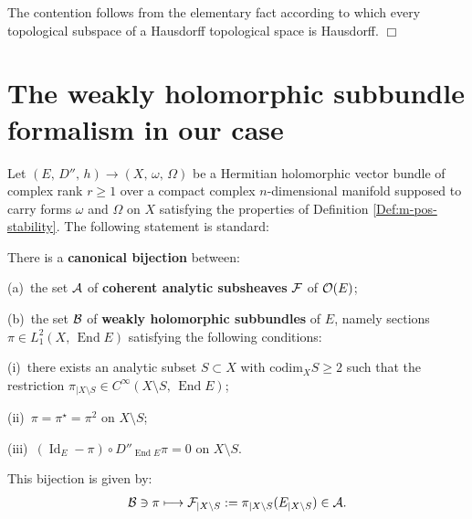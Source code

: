 \documentclass[12pt]{article}
\begin{document}
The contention follows from the elementary fact according to which every topological subspace of a Hausdorff topological space is Hausdorff.  \hfill $\Box$



\section{The weakly holomorphic subbundle formalism in our case}\label{section:w-h-subbundle_formalism}

Let $(E,\,D'',\,h)\longrightarrow(X,\,\omega,\,\Omega)$ be a Hermitian holomorphic vector bundle of complex rank $r\geq 1$ over a compact complex $n$-dimensional manifold supposed to carry forms $\omega$ and $\Omega$ on $X$ satisfying the properties of Definition \ref{Def:m-pos-stability}. The following statement is standard:

\begin{Fact}\label{Fact:sheaf_pi} There is a {\bf canonical bijection} between:

\vspace{1ex}

\noindent (a)\, the set ${\cal A}$ of {\bf coherent analytic subsheaves} ${\cal F}$ of ${\cal O}(E)$;

\vspace{1ex}

\noindent (b)\, the set ${\cal B}$ of {\bf weakly holomorphic subbundles} of $E$, namely sections $\pi\in L^2_1(X,\,\operatorname{End}E)$ satisfying the following conditions:

\vspace{1ex}

(i)\, there exists an analytic subset $S\subset X$ with $\mbox{codim}_XS\geq 2$ such that the restriction $\pi_{|X\setminus S}\in C^\infty(X\setminus S,\,\operatorname{End}E)$;

\vspace{1ex}

(ii)\, $\pi = \pi^\star = \pi^2$ on $X\setminus S$;

\vspace{1ex}

(iii)\, $(\operatorname{Id}_E - \pi)\circ D''_{\operatorname{End}E}\pi = 0$  on $X\setminus S$. 

\vspace{1ex}

This bijection is given by: \begin{eqnarray*}{\cal B}\ni\pi\longmapsto{\cal F}_{|X\setminus S}:=\pi_{|X\setminus S}(E_{|X\setminus S})\in{\cal A}.\end{eqnarray*}

\end{Fact}  
\end{document}
